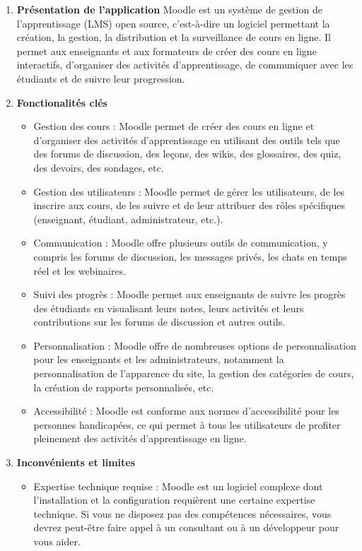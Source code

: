 \begin{enumerate}[label=\alph*]
    \item \textbf{Présentation de l'application} \newline Moodle est un système de gestion de l'apprentissage (LMS) open source, c'est-à-dire un logiciel permettant la création, la gestion, la distribution et la surveillance de cours en ligne. Il permet aux enseignants et aux formateurs de créer des cours en ligne interactifs, d'organiser des activités d'apprentissage, de communiquer avec les étudiants et de suivre leur progression.
    \item \textbf{Fonctionalités clés} 
        \begin{itemize}
            \item Gestion des cours : Moodle permet de créer des cours en ligne et d'organiser des activités d'apprentissage en utilisant des outils tels que des forums de discussion, des leçons, des wikis, des glossaires, des quiz, des devoirs, des sondages, etc.
            \item Gestion des utilisateurs : Moodle permet de gérer les utilisateurs, de les inscrire aux cours, de les suivre et de leur attribuer des rôles spécifiques (enseignant, étudiant, administrateur, etc.).
            \item Communication : Moodle offre plusieurs outils de communication, y compris les forums de discussion, les messages privés, les chats en temps réel et les webinaires.
            \item Suivi des progrès : Moodle permet aux enseignants de suivre les progrès des étudiants en visualisant leurs notes, leurs activités et leurs contributions sur les forums de discussion et autres outils.
            \item Personnalisation : Moodle offre de nombreuses options de personnalisation pour les enseignants et les administrateurs, notamment la personnalisation de l'apparence du site, la gestion des catégories de cours, la création de rapports personnalisés, etc.
            \item Accessibilité : Moodle est conforme aux normes d'accessibilité pour les personnes handicapées, ce qui permet à tous les utilisateurs de profiter pleinement des activités d'apprentissage en ligne.
        \end{itemize}
    \item \textbf{Inconvénients et limites}
        \begin{itemize}
            \item Expertise technique requise : Moodle est un logiciel complexe dont l'installation et la configuration requièrent une certaine expertise technique. Si vous ne disposez pas des compétences nécessaires, vous devrez peut-être faire appel à un consultant ou à un développeur pour vous aider.

\end{itemize}
\end{enumerate}
